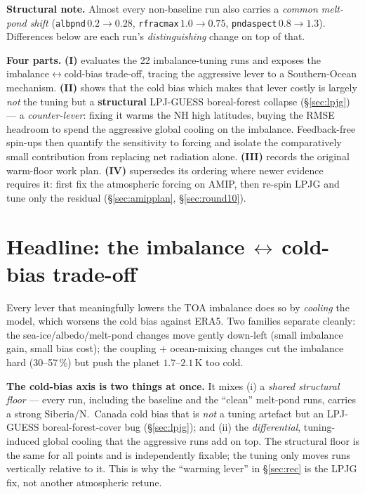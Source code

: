 \documentclass[10pt]{article}
\begin{document}
\textbf{Structural note.} Almost every non-baseline run also carries a \emph{common melt-pond shift}
(\texttt{albpnd}\,$0.2\!\to\!0.28$, \texttt{rfracmax}\,$1.0\!\to\!0.75$, \texttt{pndaspect}\,$0.8\!\to\!1.3$).
Differences below are each run's \emph{distinguishing} change on top of that.

\textbf{Four parts.} \textbf{(I)} evaluates the 22 imbalance-tuning runs and exposes the imbalance$\leftrightarrow$cold-bias
trade-off, tracing the aggressive lever to a Southern-Ocean mechanism. \textbf{(II)} shows that the cold bias which
makes that lever costly is largely \emph{not} the tuning but a \textbf{structural} LPJ-GUESS boreal-forest collapse
(\S\ref{sec:lpjg}) --- a \emph{counter-lever}: fixing it warms the NH high latitudes, buying the RMSE headroom to spend
the aggressive global cooling on the imbalance. Feedback-free spin-ups then quantify the sensitivity to forcing
and isolate the comparatively small contribution from replacing net radiation alone. \textbf{(III)} records the
original warm-floor work plan. \textbf{(IV)} supersedes its ordering where newer evidence requires it: first fix
the atmospheric forcing on AMIP, then re-spin LPJG and tune only the residual
(\S\ref{sec:amipplan}, \S\ref{sec:round10}).

\section{Headline: the imbalance\,$\leftrightarrow$\,cold-bias trade-off}
Every lever that meaningfully lowers the TOA imbalance does so by \emph{cooling} the model, which worsens the
cold bias against ERA5. Two families separate cleanly: the sea-ice/albedo/melt-pond changes move gently
down-left (small imbalance gain, small bias cost); the coupling + ocean-mixing changes cut the imbalance hard
(30--57\,\%) but push the planet $1.7$--$2.1$\,K too cold.

\textbf{The cold-bias axis is two things at once.} It mixes (i) a \emph{shared structural floor} --- every run,
including the baseline and the ``clean'' melt-pond runs, carries a strong Siberia/N.\ Canada cold bias that is
\emph{not} a tuning artefact but an LPJ-GUESS boreal-forest-cover bug (\S\ref{sec:lpjg}); and (ii) the \emph{differential},
tuning-induced global cooling that the aggressive runs add on top. The structural floor is the same for all
points and is independently fixable; the tuning only moves runs vertically relative to it. This is why the
``warming lever'' in \S\ref{sec:rec} is the LPJG fix, not another atmospheric retune.
\end{document}
